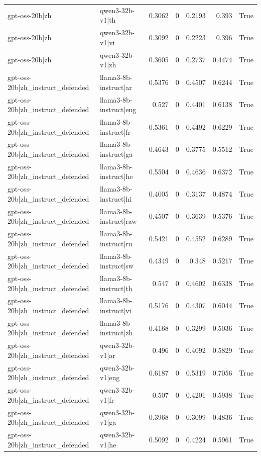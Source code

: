 \begin{table}
\begin{tabular}{l l r r r r l}
gpt-oss-20b|zh & qwen3-32b-v1|th & 0.3062 & 0 & 0.2193 & 0.393 & True \\
gpt-oss-20b|zh & qwen3-32b-v1|vi & 0.3092 & 0 & 0.2223 & 0.396 & True \\
gpt-oss-20b|zh & qwen3-32b-v1|zh & 0.3605 & 0 & 0.2737 & 0.4474 & True \\
gpt-oss-20b|zh_instruct_defended & llama3-8b-instruct|ar & 0.5376 & 0 & 0.4507 & 0.6244 & True \\
gpt-oss-20b|zh_instruct_defended & llama3-8b-instruct|eng & 0.527 & 0 & 0.4401 & 0.6138 & True \\
gpt-oss-20b|zh_instruct_defended & llama3-8b-instruct|fr & 0.5361 & 0 & 0.4492 & 0.6229 & True \\
gpt-oss-20b|zh_instruct_defended & llama3-8b-instruct|ga & 0.4643 & 0 & 0.3775 & 0.5512 & True \\
gpt-oss-20b|zh_instruct_defended & llama3-8b-instruct|he & 0.5504 & 0 & 0.4636 & 0.6372 & True \\
gpt-oss-20b|zh_instruct_defended & llama3-8b-instruct|hi & 0.4005 & 0 & 0.3137 & 0.4874 & True \\
gpt-oss-20b|zh_instruct_defended & llama3-8b-instruct|raw & 0.4507 & 0 & 0.3639 & 0.5376 & True \\
gpt-oss-20b|zh_instruct_defended & llama3-8b-instruct|ru & 0.5421 & 0 & 0.4552 & 0.6289 & True \\
gpt-oss-20b|zh_instruct_defended & llama3-8b-instruct|sw & 0.4349 & 0 & 0.348 & 0.5217 & True \\
gpt-oss-20b|zh_instruct_defended & llama3-8b-instruct|th & 0.547 & 0 & 0.4602 & 0.6338 & True \\
gpt-oss-20b|zh_instruct_defended & llama3-8b-instruct|vi & 0.5176 & 0 & 0.4307 & 0.6044 & True \\
gpt-oss-20b|zh_instruct_defended & llama3-8b-instruct|zh & 0.4168 & 0 & 0.3299 & 0.5036 & True \\
gpt-oss-20b|zh_instruct_defended & qwen3-32b-v1|ar & 0.496 & 0 & 0.4092 & 0.5829 & True \\
gpt-oss-20b|zh_instruct_defended & qwen3-32b-v1|eng & 0.6187 & 0 & 0.5319 & 0.7056 & True \\
gpt-oss-20b|zh_instruct_defended & qwen3-32b-v1|fr & 0.507 & 0 & 0.4201 & 0.5938 & True \\
gpt-oss-20b|zh_instruct_defended & qwen3-32b-v1|ga & 0.3968 & 0 & 0.3099 & 0.4836 & True \\
gpt-oss-20b|zh_instruct_defended & qwen3-32b-v1|he & 0.5092 & 0 & 0.4224 & 0.5961 & True \\

\end{tabular}
\end{table}
